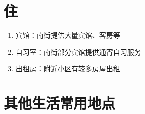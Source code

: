 \section[住]{住}
\begin{enumerate}
    \item 宾馆：南街提供大量宾馆、客房等
    \item 自习室：南街部分宾馆提供通宵自习服务
    \item 出租房：附近小区有较多房屋出租\footnotemark
\end{enumerate}

\section[其他生活常用地点]{其他生活常用地点}
\label{common_locations}
